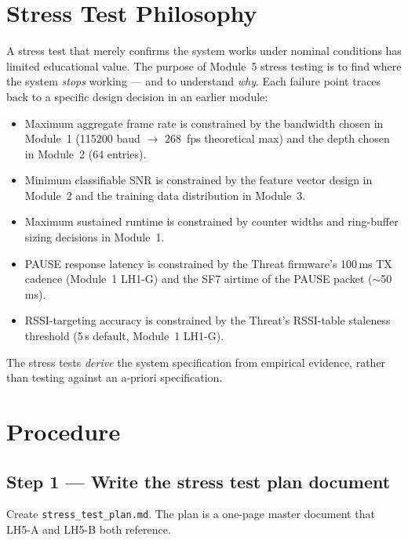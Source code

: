\documentclass[11pt,letterpaper]{article}
\begin{document}
\section{Stress Test Philosophy}
A stress test that merely confirms the system works under nominal conditions has limited educational value. The purpose of Module~5 stress testing is to find where the system \emph{stops} working --- and to understand \emph{why}. Each failure point traces back to a specific design decision in an earlier module:
\begin{itemize}[leftmargin=2em]
	\item Maximum aggregate frame rate is constrained by the \UART{} bandwidth chosen in Module~1 (115200 baud $\to$ 268~fps theoretical max) and the \FIFO{} depth chosen in Module~2 (64 entries).
	\item Minimum classifiable \mbox{SNR} is constrained by the feature vector design in Module~2 and the training data distribution in Module~3.
	\item Maximum sustained runtime is constrained by counter widths and ring-buffer sizing decisions in Module~1.
	\item PAUSE response latency is constrained by the Threat firmware's 100\,ms TX cadence (Module~1 LH1-G) and the SF7 airtime of the PAUSE packet ($\sim$50\,ms).
	\item RSSI-targeting accuracy is constrained by the Threat's RSSI-table staleness threshold (5\,s default, Module~1 LH1-G).
\end{itemize}
The stress tests \emph{derive} the system specification from empirical evidence, rather than testing against an a-priori specification.

\section{Procedure}

\subsection{Step 1 --- Write the stress test plan document}
Create \texttt{stress\_test\_plan.md}. The plan is a one-page master document that LH5-A and LH5-B both reference.
\end{document}
